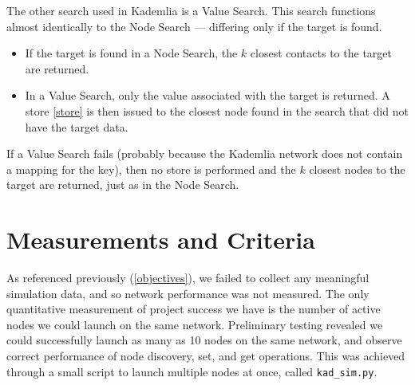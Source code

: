 \documentclass[12pt]{report}
\newcommand{\code}[1]{\colorbox{codegray}{\texttt{#1}}}
\begin{document}
        The other search used in Kademlia is a Value Search. This search
        functions almost identically to the Node Search --- differing only if
        the target is found. 
        \begin{itemize}
            \item If the target is found in a Node Search, the $k$ closest
                contacts to the target are returned. 
            \item In a Value Search, only the value associated with the target
                is returned. A store \ref{store} is then issued to the closest
                node found in the search that did not have the target data. 
        \end{itemize}
        If a Value Search fails (probably because the Kademlia network does not
        contain a mapping for the key), then no store is performed and the $k$
        closest nodes to the target are returned, just as in the Node Search.

    \section{Measurements and Criteria}
    As referenced previously (\ref{objectives}), we failed to collect any
    meaningful simulation data, and so network performance was not measured.
    The only quantitative measurement of project success we have is the number
    of active nodes we could launch on the same network.  Preliminary testing
    revealed we could successfully launch as many as 10 nodes on the same
    network, and observe correct performance of node discovery, set, and get
    operations.  This was achieved through a small script to launch multiple
    nodes at once, called \code{kad\_sim.py}.
\end{document}
